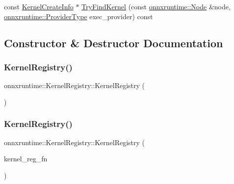 \begin{DoxyCompactItemize}
\item 
const \mbox{\hyperlink{structonnxruntime_1_1KernelCreateInfo}{Kernel\+Create\+Info}} $\ast$ \mbox{\hyperlink{classonnxruntime_1_1KernelRegistry_a3f6d5f5e7596082346a3fe54f3cb3ba9}{Try\+Find\+Kernel}} (const \mbox{\hyperlink{classonnxruntime_1_1Node}{onnxruntime\+::\+Node}} \&node, \mbox{\hyperlink{namespaceonnxruntime_a863e2227cbf32aab76aad35fdadff4bb}{onnxruntime\+::\+Provider\+Type}} exec\+\_\+provider) const
\end{DoxyCompactItemize}


\subsection{Constructor \& Destructor Documentation}
\mbox{\label{classonnxruntime_1_1KernelRegistry_a8cf1430354125b884cb971db39a09bfc}} 
\subsubsection{\texorpdfstring{Kernel\+Registry()}{KernelRegistry()}\hspace{0.1cm}{\footnotesize\ttfamily [1/2]}}
{\footnotesize\ttfamily onnxruntime\+::\+Kernel\+Registry\+::\+Kernel\+Registry (\begin{DoxyParamCaption}{ }\end{DoxyParamCaption})\hspace{0.3cm}{\ttfamily [default]}}

\mbox{\label{classonnxruntime_1_1KernelRegistry_a1ed25e686743eb25c3f94a8ff4c47fc4}} 
\subsubsection{\texorpdfstring{Kernel\+Registry()}{KernelRegistry()}\hspace{0.1cm}{\footnotesize\ttfamily [2/2]}}
{\footnotesize\ttfamily onnxruntime\+::\+Kernel\+Registry\+::\+Kernel\+Registry (\begin{DoxyParamCaption}\item[{std\+::function$<$ \mbox{\hyperlink{mlasi_8h_a88f941d423cb2a819b70a1358982b1a6}{void}}(std\+::function$<$ \mbox{\hyperlink{mlasi_8h_a88f941d423cb2a819b70a1358982b1a6}{void}}(\mbox{\hyperlink{structonnxruntime_1_1KernelCreateInfo}{Kernel\+Create\+Info}} \&\&)$>$)$>$}]{kernel\+\_\+reg\+\_\+fn }\end{DoxyParamCaption})\hspace{0.3cm}{\ttfamily [inline]}}



